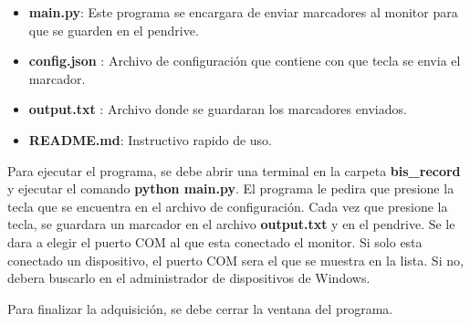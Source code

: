 \documentclass{article}
\begin{document}
\begin{itemize}
	\item \textbf{main.py}: Este programa se encargara de enviar marcadores al monitor para que se guarden en el pendrive.
	\item \textbf{config.json }: Archivo de configuración que contiene con que tecla se envia el marcador.
	\item \textbf{output.txt} : Archivo donde se guardaran los marcadores enviados.
	\item \textbf{README.md}: Instructivo rapido de uso.
\end{itemize}


Para ejecutar el programa, se debe abrir una terminal en la carpeta \textbf{bis\_record} y ejecutar el comando \textbf{python main.py}. El programa le pedira que presione la tecla que se encuentra en el archivo de configuración. Cada vez que presione la tecla, se guardara un marcador en el archivo \textbf{output.txt} y en el pendrive. Se le dara a elegir el puerto COM al que esta conectado el monitor. Si solo esta conectado un dispositivo, el puerto COM sera el que se muestra en la lista. Si no, debera buscarlo en el administrador de dispositivos de Windows.

Para finalizar la adquisición, se debe cerrar la ventana del programa. 
\end{document}
